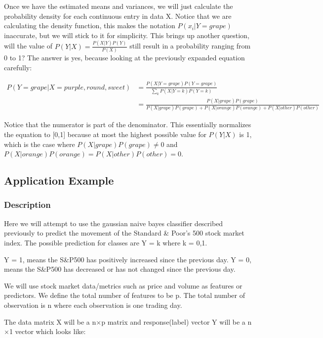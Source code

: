 \documentclass{article}
\begin{document}
Once we have the estimated means and variances, we will just calculate the probability density for each continuous entry in data X. Notice that we are calculating the density function, this makes the notation $P(x_{i}|Y=grape)$ inaccurate, but we will stick to it for simplicity. This brings up another question, will the value of $P(Y|X)=\frac{P(X|Y)P(Y)}{P(X)}$ still result in a probability ranging from 0 to 1? The answer is yes, because looking at the previously expanded equation carefully:

\begin{align*}
P(Y=grape|X=purple,round,sweet) &= \frac{P(X|Y=grape)P(Y=grape)}{\sum_{k} P(X|Y=k)P(Y=k)}\\
&= \frac{P(X|grape)P(grape)}{P(X|grape)P(grape)+P(X|orange)P(orange)+P(X|other)P(other)}
\end{align*}

Notice that the numerator is part of the denominator. This essentially normalizes the equation to [0,1] because at most the highest possible value for $P(Y|X)$ is 1, which is the case where $P(X|grape)P(grape)\neq0$ and $P(X|orange)P(orange)=P(X|other)P(other)=0$. 

\newpage
\subsection{Application Example}

\subsubsection{Description}
Here we will attempt to use the gaussian naive bayes classifier described previously to predict the movement of the Standard \& Poor's 500 stock market index. The possible prediction for classes are Y = k where k = 0,1.\newline

\noindent Y = 1, means the S\&P500 has positively increased since the previous day.\newline
Y = 0, means the S\&P500 has decreased or has not changed since the previous day.\newline

We will use stock market data/metrics such as price and volume as features or predictors. We define the total number of features to be p. The total number of observation is n where each observation is one trading day.\newline

The data matrix X will be a n$\times$p matrix and response(label) vector Y will be a n$\times$1 vector which looks like:
\end{document}

